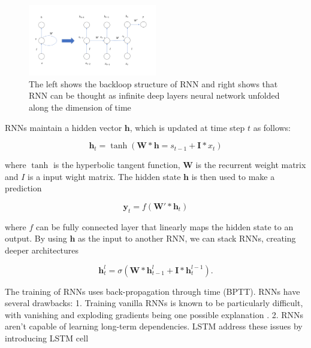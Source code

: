 \documentclass[5p]{elsarticle}
\begin{document}
 
\begin{figure}[h]
    \centering
    \includegraphics[width=0.5\textwidth]{RNN.png}
    \caption{The left shows the backloop structure of RNN and right shows that RNN can be thought as infinite deep layers neural network unfolded along the dimension of time}
    \label{fig:RNN can be thought as infinite deep layers neural network along the dimensions of time}
\end{figure}


RNNs maintain a hidden vector $\mathbf h$, which is updated at time step $t$ as follows:

\begin{equation}
	\mathbf h_t = \tanh(\mathbf W * \mathbf h=s_{t-1} + \mathbf I * x_t)
\end{equation}

where $\tanh$ is the hyperbolic tangent function, $\mathbf W$ is the recurrent weight matrix and $I$ is a input wight matrix. The hidden state $\mathbf h$ is then used to make a prediction

\begin{equation}
	\mathbf y_t = f(\mathbf W' * \mathbf h_{t})
\end{equation}

where $f$ can be fully connected layer that linearly maps the hidden state to an output. By using $\mathbf h$ as the input to another RNN, we can stack RNNs, creating deeper architectures 

\begin{equation}
	\mathbf h_t^{l} = \sigma(\mathbf W * \mathbf h_{t-1}^{l} + \mathbf I * \mathbf h_t^{l-1}).
\end{equation}

The training of RNNs uses back-propagation through time (BPTT). RNNs have several drawbacks: 1. Training vanilla RNNs is known to be particularly difficult, with vanishing and exploding gradients being one possible explanation \cite{Bengio1994LearningDifficult}. 2. RNNs aren't capable of learning long-term dependencies. LSTM address these issues by introducing LSTM cell\cite{Hochreiter1997LongMemory} 
\end{document}
